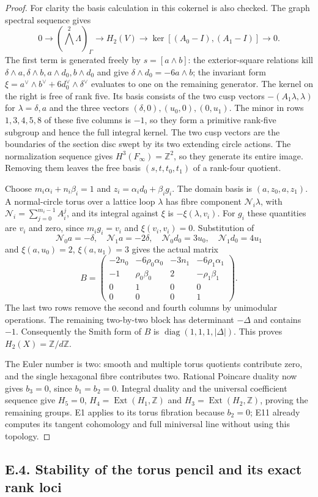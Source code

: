 \begin{proof}
For clarity the basis calculation in this cokernel is also
checked. The graph spectral sequence gives
\[
0\longrightarrow(\textstyle\bigwedge^2\Lambda)_\Gamma
 \longrightarrow H_2(V)
 \longrightarrow\ker[(A_0-I),(A_1-I)]\longrightarrow0.
\]
The first term is generated freely by $s=[a\wedge b]$:
the exterior-square relations kill
$\delta\wedge a,\delta\wedge b,a\wedge d_0,b\wedge d_0$
and give $\delta\wedge d_0=-6a\wedge b$; the invariant
form $\xi=a^\vee\wedge b^\vee+6d_0^\vee\wedge\delta^\vee$
evaluates to one on the remaining generator. The kernel on the
right is free of rank five. Its basis consists of the two cusp
vectors $-(A_1\lambda,\lambda)$ for $\lambda=\delta,a$ and
the three vectors $(\delta,0),(u_0,0),(0,u_1)$.
The minor in rows $1,3,4,5,8$ of these five columns is $-1$,
so they form a primitive rank-five subgroup and hence the full
integral kernel.
The two cusp vectors are the boundaries of the section disc
swept by its two extending circle actions. The normalization
sequence gives $H^3(F_\infty)=\mathbb Z^2$, so they generate
its entire image. Removing them leaves the free basis
$(s,t,t_0,t_1)$ of a rank-four quotient.

Choose $m_i\alpha_i+n_i\beta_i=1$ and
$z_i=\alpha_i d_0+\beta_i g_i$. The domain basis is
$(a,z_0,a,z_1)$. A normal-circle torus over a lattice loop
$\lambda$ has fibre component
$\mathcal N_i\lambda$, with
$\mathcal N_i=\sum_{j=0}^{m_i-1}A_i^j$, and its integral
against $\xi$ is $-\xi(\lambda,v_i)$. For $g_i$ these
quantities are $v_i$ and zero, since $m_i g_i=v_i$ and
$\xi(v_i,v_i)=0$. Substitution of
\[
 \mathcal N_0a=-\delta,\quad\mathcal N_1a=-2\delta,
 \quad\mathcal N_0d_0=3u_0,\quad\mathcal N_1d_0=4u_1
\]
and $\xi(a,u_0)=2$, $\xi(a,u_1)=3$ gives the actual matrix
\[
 B=\begin{pmatrix}
 -2n_0&-6\rho_0\alpha_0&-3n_1&-6\rho_1\alpha_1\\
 -1&\rho_0\beta_0&2&-\rho_1\beta_1\\
 0&1&0&0\\0&0&0&1
 \end{pmatrix}.                              \tag{E.19.2}
\]
The last two rows remove the second and fourth columns by
unimodular operations. The remaining two-by-two block has
determinant $-\Delta$ and contains $-1$. Consequently the Smith
form of $B$ is $\operatorname{diag}(1,1,1,|\Delta|)$.
This proves $H_2(X)=\mathbb Z/d\mathbb Z$.

The Euler number is two: smooth and multiple torus quotients
contribute zero, and the single hexagonal fibre contributes two.
Rational Poincare duality now gives $b_3=0$, since $b_1=b_2=0$.
Integral duality and the universal coefficient sequence give
$H_5=0$, $H_4=\operatorname{Ext}(H_1,\mathbb Z)$ and
$H_3=\operatorname{Ext}(H_2,\mathbb Z)$, proving the remaining
groups. E1 applies to its torus fibration because $b_2=0$;
E11 already computes its tangent cohomology and full miniversal
line without using this topology.
\end{proof}


\subsection{E.4. Stability of the torus pencil and its exact rank loci}


